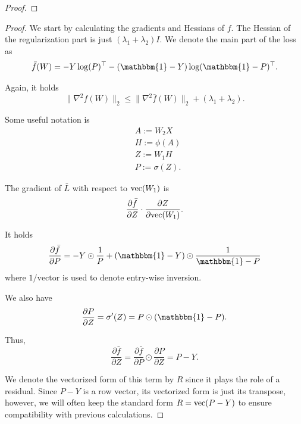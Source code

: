 \documentclass[a4paper,11pt]{article}
\newcommand{\1}{\mathbbm{1}}
\theoremstyle{plain}
\begin{document}
\begin{proof}
    
\end{proof}


\crossentropy*

\begin{proof}

We start by calculating the gradients and Hessians of $f$. The Hessian of the regularization part is just $(\lambda_1+\lambda_2) I$. We denote the main part of the loss as 
\begin{equation*}
    \bar f(W) = -Y \log(P)^\top-(\1-Y) \log(\1-P)^\top.
\end{equation*}

Again, it holds
\begin{equation*}
    \|\nabla^2 f(W)\|_2 \leq \| \nabla^2 \bar f(W)\|_2 + (\lambda_1+\lambda_2).
\end{equation*}

Some useful notation is
\begin{align*}
    & A := W_2 X \\
    & H := \phi(A) \\
    & Z := W_1 H \\
    & P := \sigma(Z).
\end{align*}


The gradient of $\bar L$ with respect to $\textnormal{vec}(W_1)$ is 
\begin{equation*}
    \frac{\partial \bar f}{\partial Z} \cdot \frac{\partial Z}{\partial \textnormal{vec}(W_1)}. 
\end{equation*}

It holds
\begin{equation*}
    \frac{ \partial \bar f}{\partial P} = -Y \odot \frac{1}{P} + (\1-Y) \odot \frac{1}{\1-P}
\end{equation*}
where $1/\text{vector}$ is used to denote entry-wise inversion.

We also have
\begin{equation*}
    \frac{\partial P}{\partial Z} = \sigma'(Z) = P \odot (\1-P).
\end{equation*}

Thus,
\begin{equation*}
  \frac{\partial \bar f}{\partial Z} = \frac{\partial \bar f}{\partial P} \odot \frac{\partial P}{\partial Z} = P-Y.
\end{equation*}

We denote the vectorized form of this term by $R$ since it plays the role of a residual. Since $P-Y$ is a row vector, its vectorized form is just its transpose, however, we will often keep the standard form $R = \textnormal{vec}(P-Y)$ to ensure compatibility with previous calculations. 


\end{proof}
\end{document}
